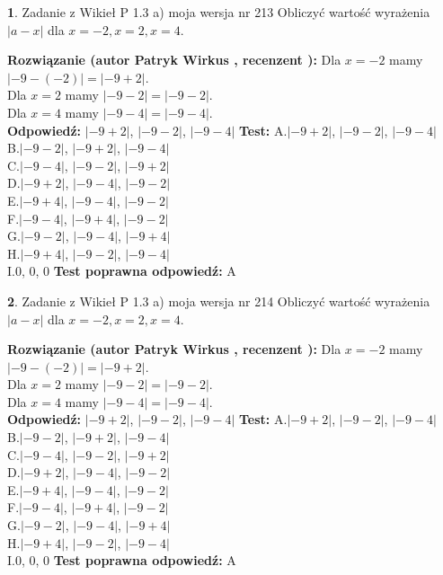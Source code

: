 \documentclass[12pt, a4paper]{article}
\theoremstyle{definition} %
\newtheorem{zad}{}
\newcommand{\zadStart}[1]{\begin{zad}#1\newline}
\newcommand{\zadStop}{\end{zad}}
\newcommand{\rozwStart}[2]{\noindent \textbf{Rozwiązanie (autor #1 , recenzent #2): }\newline}
\newcommand{\rozwStop}{\newline}
\newcommand{\odpStart}{\noindent \textbf{Odpowiedź:}\newline}
\newcommand{\odpStop}{\newline}
\newcommand{\testStart}{\noindent \textbf{Test:}\newline}
\newcommand{\testStop}{\newline}
\newcommand{\kluczStart}{\noindent \textbf{Test poprawna odpowiedź:}\newline}
\newcommand{\kluczStop}{\newline}
\begin{document}
\zadStart{Zadanie z Wikieł P 1.3 a) moja wersja nr 213}
Obliczyć wartość wyrażenia $|a - x|$ dla $x=-2,x=2,x=4$.
\zadStop
\rozwStart{Patryk Wirkus}{}
Dla $x = -2$ mamy $|-9 - (-2)| = |-9 + 2|$.\\
Dla $x = 2$ mamy $|-9 - 2| = |-9 - 2|$.\\
Dla $x = 4$ mamy $|-9 - 4| = |-9 - 4|$.\\
\rozwStop
\odpStart
$|-9 + 2|$, $|-9 - 2|$, $|-9 - 4|$
\odpStop
\testStart
A.$|-9 + 2|$, $|-9 - 2|$, $|-9 - 4|$\\
B.$|-9 - 2|$, $|-9 + 2|$, $|-9 - 4|$\\
C.$|-9 - 4|$, $|-9 - 2|$, $|-9 + 2|$\\
D.$|-9 + 2|$, $|-9 - 4|$, $|-9 - 2|$\\
E.$|-9 + 4|$, $|-9 - 4|$, $|-9 - 2|$\\
F.$|-9 - 4|$, $|-9 + 4|$, $|-9 - 2|$\\
G.$|-9 - 2|$, $|-9 - 4|$, $|-9 + 4|$\\
H.$|-9 + 4|$, $|-9 - 2|$, $|-9 - 4|$\\
I.$0$, $0$, $0$
\testStop
\kluczStart
A
\kluczStop



\zadStart{Zadanie z Wikieł P 1.3 a) moja wersja nr 214}
Obliczyć wartość wyrażenia $|a - x|$ dla $x=-2,x=2,x=4$.
\zadStop
\rozwStart{Patryk Wirkus}{}
Dla $x = -2$ mamy $|-9 - (-2)| = |-9 + 2|$.\\
Dla $x = 2$ mamy $|-9 - 2| = |-9 - 2|$.\\
Dla $x = 4$ mamy $|-9 - 4| = |-9 - 4|$.\\
\rozwStop
\odpStart
$|-9 + 2|$, $|-9 - 2|$, $|-9 - 4|$
\odpStop
\testStart
A.$|-9 + 2|$, $|-9 - 2|$, $|-9 - 4|$\\
B.$|-9 - 2|$, $|-9 + 2|$, $|-9 - 4|$\\
C.$|-9 - 4|$, $|-9 - 2|$, $|-9 + 2|$\\
D.$|-9 + 2|$, $|-9 - 4|$, $|-9 - 2|$\\
E.$|-9 + 4|$, $|-9 - 4|$, $|-9 - 2|$\\
F.$|-9 - 4|$, $|-9 + 4|$, $|-9 - 2|$\\
G.$|-9 - 2|$, $|-9 - 4|$, $|-9 + 4|$\\
H.$|-9 + 4|$, $|-9 - 2|$, $|-9 - 4|$\\
I.$0$, $0$, $0$
\testStop
\kluczStart
A
\kluczStop
\end{document}
